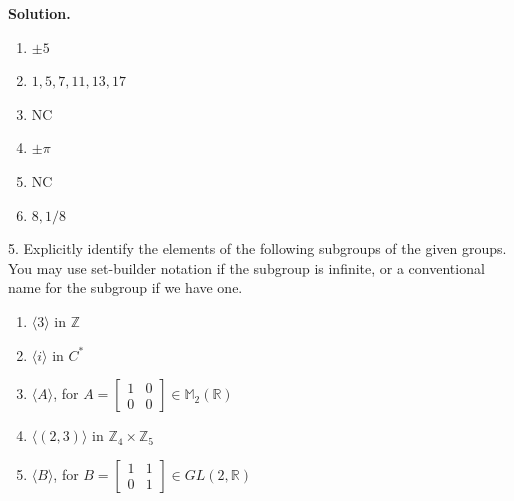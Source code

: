 \documentclass[10pt,]{book}
\theoremstyle{plain}
\theoremstyle{definition}
\theoremstyle{definition}
\theoremstyle{definition}
\theoremstyle{definition}
\numberwithin{equation}{section}
\def\Z{\mathbb{Z}}
\def\R{\mathbb{R}}
\def\M{\mathbb{M}}
\newcommand{\amp}{ & }
\begin{document}
\begin{exerciselist}
\par\smallskip
\par\smallskip
\noindent\textbf{Solution.}\hypertarget{solution-37}{}\quad
\leavevmode%
\begin{enumerate}[label=(\alph*)]
\item\hypertarget{li-299}{}
          \(\pm 5\)
\item\hypertarget{li-300}{}
          \(1,5,7,11,13,17\)
\item\hypertarget{li-301}{}
          NC
\item\hypertarget{li-302}{}
          \(\pm \pi\)
\item\hypertarget{li-303}{}
          NC
\item\hypertarget{li-304}{}
          \(8,1/8\)
\end{enumerate}
\item[5.]\hypertarget{exercise-38}{}
        Explicitly identify the elements of the following subgroups of the given groups. You may use set-builder notation if the subgroup is infinite, or a conventional name for the subgroup if we have one.
        \leavevmode%
\begin{enumerate}[label=(\alph*)]
\item\hypertarget{li-305}{}
              \(\langle 3\rangle\) in \(\Z\)
\item\hypertarget{li-306}{}
              \(\langle i\rangle\) in \(C^*\)
\item\hypertarget{li-307}{}
              \(\langle A\rangle\), for \(A=\left[ \begin{array}{cc}
              1 \amp  0 \\
              0 \amp  0
              \end{array} 
              \right]\in \M_2(\R)\)
\item\hypertarget{li-308}{}
              \(\langle (2,3)\rangle\) in \(\Z_4\times \Z_5\)
\item\hypertarget{li-309}{}
              \(\langle B\rangle\), for \(B=\left[ \begin{array}{cc}
              1 \amp  1\\
              0 \amp  1
              \end{array} 
              \right]\in GL(2,\R)\)
\end{enumerate}


\end{exerciselist}
\end{document}
